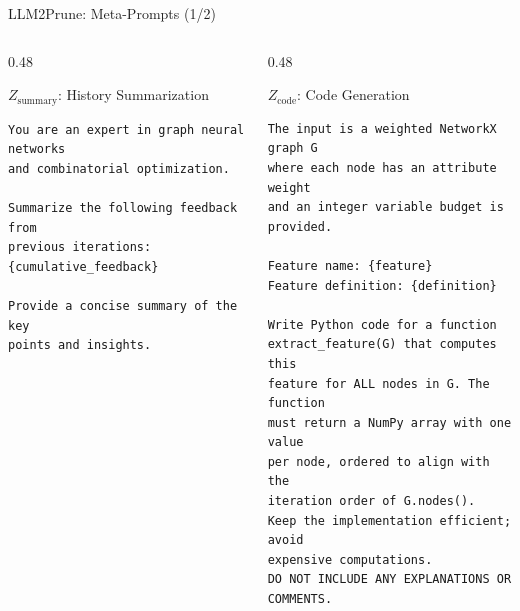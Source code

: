 \documentclass[aspectratio=169,xcolor=dvipsnames,8pt]{beamer}
\begin{document}
\begin{frame}[fragile]{LLM2Prune: Meta-Prompts (1/2)}
  \begin{columns}[T]
    \begin{column}{0.48\textwidth}
      \begin{block}{$Z_{\text{summary}}$: History Summarization}
        \begin{verbatim}
You are an expert in graph neural networks
and combinatorial optimization.

Summarize the following feedback from
previous iterations:
{cumulative_feedback}

Provide a concise summary of the key
points and insights.
        \end{verbatim}
      \end{block}
    \end{column}
    \begin{column}{0.48\textwidth}
      \begin{block}{$Z_{\text{code}}$: Code Generation}
        \begin{verbatim}
The input is a weighted NetworkX graph G
where each node has an attribute weight
and an integer variable budget is provided.

Feature name: {feature}
Feature definition: {definition}

Write Python code for a function
extract_feature(G) that computes this
feature for ALL nodes in G. The function
must return a NumPy array with one value
per node, ordered to align with the
iteration order of G.nodes().
Keep the implementation efficient; avoid
expensive computations.
DO NOT INCLUDE ANY EXPLANATIONS OR
COMMENTS.
        \end{verbatim}
      \end{block}
    \end{column}
  \end{columns}
\end{frame}
\end{document}

